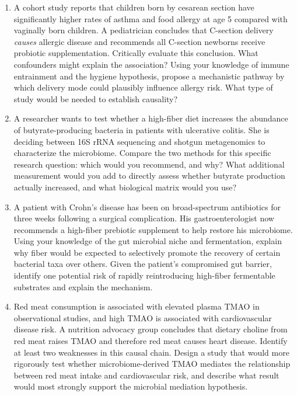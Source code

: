 \documentclass{tufte-handout}
\begin{document}
\begin{enumerate}

\item A cohort study reports that children born by cesarean section have significantly higher rates of asthma and food allergy at age 5 compared with vaginally born children. A pediatrician concludes that C-section delivery \textit{causes} allergic disease and recommends all C-section newborns receive probiotic supplementation. Critically evaluate this conclusion. What confounders might explain the association? Using your knowledge of immune entrainment and the hygiene hypothesis, propose a mechanistic pathway by which delivery mode could plausibly influence allergy risk. What type of study would be needed to establish causality?

\item A researcher wants to test whether a high-fiber diet increases the abundance of butyrate-producing bacteria in patients with ulcerative colitis. She is deciding between 16S rRNA sequencing and shotgun metagenomics to characterize the microbiome. Compare the two methods for this specific research question: which would you recommend, and why? What additional measurement would you add to directly assess whether butyrate production actually increased, and what biological matrix would you use?

\item A patient with Crohn's disease has been on broad-spectrum antibiotics for three weeks following a surgical complication. His gastroenterologist now recommends a high-fiber prebiotic supplement to help restore his microbiome. Using your knowledge of the gut microbial niche and fermentation, explain why fiber would be expected to selectively promote the recovery of certain bacterial taxa over others. Given the patient's compromised gut barrier, identify one potential risk of rapidly reintroducing high-fiber fermentable substrates and explain the mechanism.

\item Red meat consumption is associated with elevated plasma TMAO in observational studies, and high TMAO is associated with cardiovascular disease risk. A nutrition advocacy group concludes that dietary choline from red meat raises TMAO and therefore red meat causes heart disease. Identify at least two weaknesses in this causal chain. Design a study that would more rigorously test whether microbiome-derived TMAO mediates the relationship between red meat intake and cardiovascular risk, and describe what result would most strongly support the microbial mediation hypothesis.


\end{enumerate}
\end{document}
